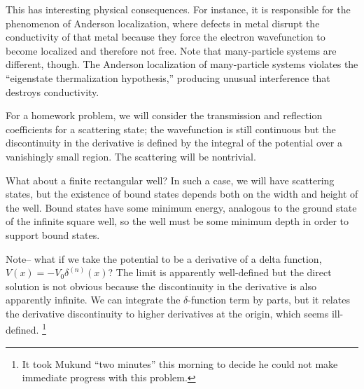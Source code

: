 This has interesting physical consequences. For instance, it is responsible for the phenomenon of Anderson localization, where defects in metal disrupt the conductivity of that metal because they force the electron wavefunction to become localized and therefore not free. Note that many-particle systems are different, though. The Anderson localization of many-particle systems violates the ``eigenstate thermalization hypothesis,'' producing unusual interference that destroys conductivity.%

For a homework problem, we will consider the transmission and reflection coefficients for a scattering state; the wavefunction is still continuous but the discontinuity in the derivative is defined by the integral of the potential over a vanishingly small region. The scattering will be nontrivial.

What about a finite rectangular well? In such a case, we will have scattering states, but the existence of bound states depends both on the width and height of the well. Bound states have some minimum energy, analogous to the ground state of the infinite square well, so the well must be some minimum depth in order to support bound states.

Note-- what if we take the potential to be a derivative of a delta function, $V(x) = -V_0 \delta^{(n)}(x)$? The limit is apparently well-defined but the direct solution is not obvious because the discontinuity in the derivative is also apparently infinite. We can integrate the $\delta$-function term by parts, but it relates the derivative discontinuity to higher derivatives at the origin, which seems ill-defined.%
    \footnote{It took Mukund ``two minutes'' this morning to decide he could not make immediate progress with this problem.}

